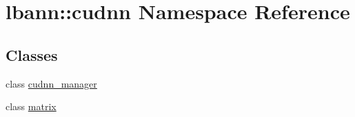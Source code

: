 \hypertarget{namespacelbann_1_1cudnn}{}\section{lbann\+:\+:cudnn Namespace Reference}
\label{namespacelbann_1_1cudnn}
\subsection*{Classes}
\begin{DoxyCompactItemize}
\item 
class \hyperlink{classlbann_1_1cudnn_1_1cudnn__manager}{cudnn\+\_\+manager}
\item 
class \hyperlink{classlbann_1_1cudnn_1_1matrix}{matrix}
\end{DoxyCompactItemize}
